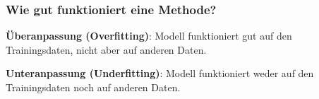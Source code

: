 \documentclass[aspectratio=169]{beamer}
\begin{document}
\begin{frame}
  \frametitle{Wie gut funktioniert eine Methode?}

  \begin{block}{}
    \begin{center}
      \textbf{Überanpassung (Overfitting)}: Modell funktioniert gut
      auf den Trainingsdaten, nicht aber auf anderen Daten.\\
    \end{center}
  \end{block}

  
  \begin{block}{}
    \begin{center}
      \textbf{Unteranpassung (Underfitting)}: Modell funktioniert
      weder auf den Trainingsdaten noch auf anderen Daten.\\
    \end{center}
  \end{block}
  

  
\end{frame}


  
\end{document}
